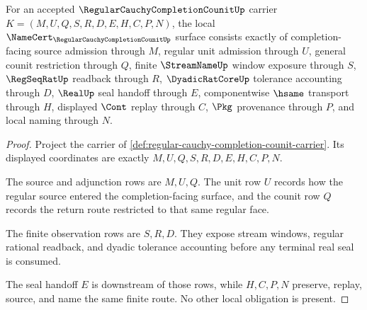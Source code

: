 \begin{theorem}
\label{thm:regular-cauchy-completion-counit-namecert-obligations}
For an accepted $\RegularCauchyCompletionCounitUp$ carrier $K=(M,U,Q,S,R,D,E,H,C,P,N)$, the local $\NameCert_{\RegularCauchyCompletionCounitUp}$ surface consists exactly of completion-facing source admission through $M$, regular unit admission through $U$, general counit restriction through $Q$, finite $\StreamNameUp$ window exposure through $S$, $\RegSeqRatUp$ readback through $R$, $\DyadicRatCoreUp$ tolerance accounting through $D$, $\RealUp$ seal handoff through $E$, componentwise $\hsame$ transport through $H$, displayed $\Cont$ replay through $C$, $\Pkg$ provenance through $P$, and local naming through $N$.
\end{theorem}
\begin{proof}
Project the carrier of \autoref{def:regular-cauchy-completion-counit-carrier}. Its displayed coordinates are exactly $M,U,Q,S,R,D,E,H,C,P,N$.

The source and adjunction rows are $M,U,Q$. The unit row $U$ records how the regular source entered the completion-facing surface, and the counit row $Q$ records the return route restricted to that same regular face.

The finite observation rows are $S,R,D$. They expose stream windows, regular rational readback, and dyadic tolerance accounting before any terminal real seal is consumed.

The seal handoff $E$ is downstream of those rows, while $H,C,P,N$ preserve, replay, source, and name the same finite route. No other local obligation is present.
\end{proof}

